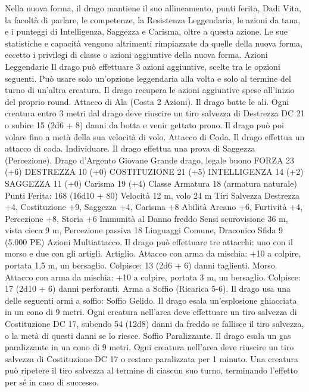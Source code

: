 \begin{multicols}{2}
Nella nuova forma, il drago mantiene il suo allineamento, punti
ferita, Dadi Vita, la facoltà di parlare, le competenze, la Resistenza
Leggendaria, le azioni da tana, e i punteggi di Intelligenza, Saggezza
e Carisma, oltre a questa azione. Le sue statistiche e capacità
vengono altrimenti rimpiazzate da quelle della nuova forma, eccetto i
privilegi di classe o azioni aggiuntive della nuova forma.
Azioni Leggendarie
Il drago può effettuare 3 azioni aggiuntive, scelte tra le opzioni
seguenti. Può usare solo un’opzione leggendaria alla volta e solo
al termine del turno di un’altra creatura. Il drago recupera le
azioni aggiuntive spese all’inizio del proprio round.
Attacco di Ala (Costa 2 Azioni). Il drago batte le ali. Ogni
creatura entro 3 metri dal drago deve riuscire un tiro salvezza di
Destrezza DC 21 o subire 15 (2d6 + 8) danni da botta e venir
gettato prono. Il drago può poi volare fino a metà della sua
velocità di volo.
Attacco di Coda. Il drago effettua un attacco di coda.
Individuare. Il drago effettua una prova di Saggezza
(Percezione).
Drago d’Argento Giovane
Grande drago, legale buono
FORZA 23 (+6)
DESTREZZA 10 (+0)
COSTITUZIONE 21 (+5)
INTELLIGENZA 14 (+2)
SAGGEZZA 11 (+0)
Carisma 19 (+4)
Classe Armatura 18 (armatura naturale)
\hspace*{0pt}\hfill{Punti Ferita}: 168 (16d10 + 80)
Velocità 12 m, volo 24 m
Tiri Salvezza Destrezza +4, Costituzione +9, Saggezza +4,
Carisma +8
Abilità Arcano +6, Furtività +4, Percezione +8, Storia +6
Immunità al Danno freddo
Sensi scurovisione 36 m, vista cieca 9 m, Percezione passiva 18
Linguaggi Comune, Draconico
Sfida 9 (5.000 PE)
Azioni
Multiattacco. Il drago può effettuare tre attacchi: uno con il
morso e due con gli artigli.
Artiglio. Attacco con arma da mischia: +10 a colpire, portata 1,5
m, un bersaglio.
Colpisce: 13 (2d6 + 6) danni taglienti.
Morso. Attacco con arma da mischia: +10 a colpire, portata 3 m,
un bersaglio.
Colpisce: 17 (2d10 + 6) danni perforanti.
Arma a Soffio (Ricarica 5-6). Il drago usa una delle seguenti armi
a soffio:
Soffio Gelido. Il drago esala un’esplosione ghiacciata in un cono di 9
metri. Ogni creatura nell’area deve effettuare un tiro salvezza di
Costituzione DC 17, subendo 54 (12d8) danni da freddo se fallisce il
tiro salvezza, o la metà di questi danni se lo riesce.
Soffio Paralizzante. Il drago esala un gas paralizzante in un cono di 9
metri. Ogni creatura nell’area deve riuscire un tiro salvezza di
Costituzione DC 17 o restare paralizzata per 1 minuto. Una creatura
può ripetere il tiro salvezza al termine di ciascun suo turno,
terminando l’effetto per sé in caso di successo.

\end{multicols}
